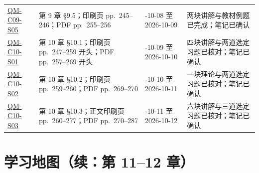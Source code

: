 \begin{center}
\begin{tabularx}{\textwidth}{@{}>{\raggedright\arraybackslash}p{2.7cm}>{\raggedright\arraybackslash}p{4.1cm}>{\raggedright\arraybackslash}p{3.0cm}X@{}}
  \hyperref[section:QM-C09-S05]{QM-C09-S05} & 第 9 章 \S 9.5；印刷页 pp.~245--246；PDF pp.~255--256 & 2026-10-08 至 2026-10-09 & 两块讲解与教材例题已完成；笔记已确认 \\
  \hyperref[section:QM-C10-S01]{QM-C10-S01} & 第 10 章 \S 10.1；印刷页 pp.~247--259 开头；PDF pp.~257--269 开头 & 2026-10-09 至 2026-10-10 & 四块讲解与两道选定习题已核对；笔记已确认 \\
  \hyperref[section:QM-C10-S02]{QM-C10-S02} & 第 10 章 \S 10.2；印刷页 pp.~259--260；PDF pp.~269--270 & 2026-10-10 至 2026-10-11 & 一块理论与两道选定习题已核对；笔记已确认 \\
  \hyperref[section:QM-C10-S03]{QM-C10-S03} & 第 10 章 \S 10.3；正文印刷页 pp.~260--277；PDF pp.~270--287 & 2026-10-11 至 2026-10-12 & 六块讲解与三道选定习题已核对；笔记已确认 \\
  \bottomrule
\end{tabularx}
\end{center}

\clearpage
\section*{学习地图（续：第 11--12 章）}

